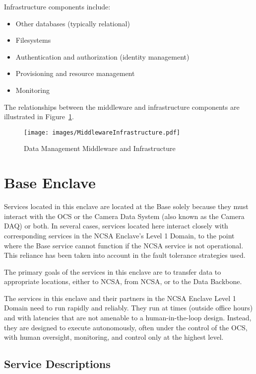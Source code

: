 \documentclass[DM,lsstdraft,toc]{lsstdoc}
\begin{document}
Infrastructure components include:
\begin{itemize}
\item
  Other databases (typically relational)
\item
  Filesystems
\item
  Authentication and authorization (identity management)
\item
  Provisioning and resource management
\item
  Monitoring
\end{itemize}

The relationships between the middleware and infrastructure components
are illustrated in Figure~\ref{fig:mwandinfra}.

\begin{figure}
\centering
\texttt{[image: images/MiddlewareInfrastructure.pdf]}
\caption{Data Management Middleware and Infrastructure}
\label{fig:mwandinfra}
\end{figure}

\section{Base Enclave}\label{base-enclave}

Services located in this enclave are located at the Base solely because
they must interact with the OCS or the Camera Data System (also known as
the Camera DAQ) or both. In several cases, services located here
interact closely with corresponding services in the NCSA Enclave's Level
1 Domain, to the point where the Base service cannot function if the
NCSA service is not operational. This reliance has been taken into
account in the fault tolerance strategies used.

The primary goals of the services in this enclave are to transfer data
to appropriate locations, either to NCSA, from NCSA, or to the Data
Backbone.

The services in this enclave and their partners in the NCSA Enclave
Level 1 Domain need to run rapidly and reliably. They run at times
(outside office hours) and with latencies that are not amenable to a
human-in-the-loop design. Instead, they are designed to execute
autonomously, often under the control of the OCS, with human oversight,
monitoring, and control only at the highest level.

\subsection{Service Descriptions}\label{base-service-descriptions}
\end{document}
